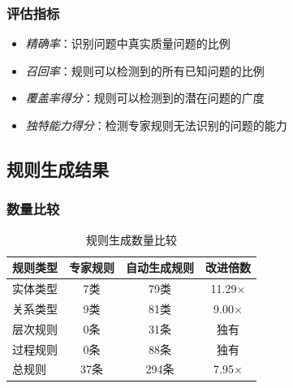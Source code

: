 \documentclass[runningheads]{llncs}
\begin{document}
\subsubsection{评估指标}
\begin{itemize}
    \item \textit{精确率}：识别问题中真实质量问题的比例
    \item \textit{召回率}：规则可以检测到的所有已知问题的比例
    \item \textit{覆盖率得分}：规则可以检测到的潜在问题的广度
    \item \textit{独特能力得分}：检测专家规则无法识别的问题的能力
\end{itemize}

\subsection{规则生成结果}

\subsubsection{数量比较}

\begin{table}[H]
    \centering
    \caption{规则生成数量比较}
    \label{tab:rule_quantity}
    \begin{tabular}{l c c c}
    \toprule
    规则类型 & 专家规则 & 自动生成规则 & 改进倍数 \\
    \midrule
    实体类型 & 7类 & 79类 & 11.29× \\
    关系类型 & 9类 & 81类 & 9.00× \\
    层次规则 & 0条 & 31条 & 独有 \\
    过程规则 & 0条 & 88条 & 独有 \\
    总规则 & 37条 & 294条 & 7.95× \\
    \bottomrule
    \end{tabular}
\end{table}
\end{document}
